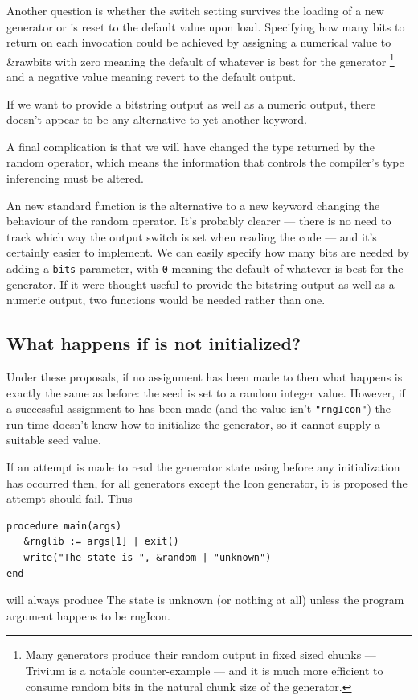 \documentclass[letterpaper,12pt]{article}
\begin{document}
Another question is whether the switch setting survives the loading of a
new generator or is reset to the default value upon load. Specifying how
many bits to return on each invocation could be achieved by assigning a
numerical value to {\sf \&rawbits} with zero meaning the default of
whatever is best for the generator%
\footnote{
  Many generators produce their random output in fixed sized chunks ---
  Trivium is a notable counter-example --- and it is much more efficient to
  consume random bits in the natural chunk size of the generator.
  }
and a negative value meaning revert to the default output.

If we want to provide a bitstring output as well as a numeric output, there
doesn't appear to be any alternative to yet another keyword.

A final complication is that we will have changed the type returned by the
random operator, which means the information that controls the compiler's
type inferencing must be altered.

An new standard function is the alternative to a new keyword changing the
behaviour of the random operator. It's probably clearer --- there is no
need to track which way the output switch is set when reading the code ---
and it's certainly easier to implement. We can easily specify how many bits
are needed by adding a \texttt{bits} parameter, with \texttt{0} meaning the
default of whatever is best for the generator. If it were thought useful to
provide the bitstring output as well as a numeric output, two functions
would be needed rather than one.

\subsection{What happens if \rndkwd is not initialized?}
Under these proposals, if no assignment has been made to \rndlibkwd then
what happens is exactly the same as before: the seed is set to a random
integer value. However, if a successful assignment to \rndlibkwd has been
made (and the value isn't \texttt{"rngIcon"}) the run-time doesn't know how
to initialize the generator, so it cannot supply a suitable seed value.

If an attempt is made to read the generator state using \rndkwd before any
initialization has occurred then, for all generators except the Icon
generator, it is proposed the attempt should fail. Thus
\begin{verbatim}
procedure main(args)
   &rnglib := args[1] | exit()
   write("The state is ", &random | "unknown")
end
\end{verbatim}
will always produce {\sf The state is unknown} (or nothing at all) unless
the program argument happens to be {\sf rngIcon}.
\end{document}
